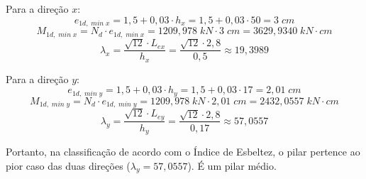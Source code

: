 Para a direção $x$:
$$e_{1d,\;min\;x}=1,5+0,03\cdot h_x=1,5+0,03\cdot50=3\;cm$$
$$M_{1d,\;min\;x}=N_d\cdot e_{1d,\;min\;x}=1209,978\;kN\cdot3\;cm=3629,9340\;kN\cdot cm$$
$$\lambda_x=\frac{\sqrt{12}\cdot L_{ex}}{h_x}=\frac{\sqrt{12}\cdot2,8}{0,5}\approx19,3989$$

Para a direção $y$:
$$e_{1d,\;min\;y}=1,5+0,03\cdot h_y=1,5+0,03\cdot17=2,01\;cm$$
$$M_{1d,\;min\;y}=N_d\cdot e_{1d,\;min\;y}=1209,978\;kN\cdot2,01\;cm=2432,0557\;kN\cdot cm$$
$$\lambda_y=\frac{\sqrt{12}\cdot L_{ey}}{h_y}=\frac{\sqrt{12}\cdot2,8}{0,17}\approx57,0557$$

Portanto, na classificação de acordo com o Índice de Esbeltez, o pilar pertence ao pior caso das duas direções ($\lambda_y=57,0557$). É um pilar médio.